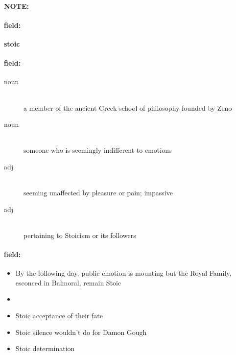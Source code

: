 \documentclass[12pt]{article}
\newenvironment{note}{\paragraph{NOTE:}}{}
\newenvironment{field}{\paragraph{field:}}{}
\begin{document}
\begin{note}
\begin{field}
\textbf{\large stoic}
\end{field}


\begin{field}
\begin{description}
\item[noun] \hfill \\ 
a member of the ancient Greek school of philosophy founded by Zeno

\item[noun] \hfill \\ 
someone who is seemingly indifferent to emotions

\item[adj] \hfill \\ 
seeming unaffected by pleasure or pain; impassive

\item[adj] \hfill \\ 
pertaining to Stoicism or its followers

\end{description}
\end{field}

\begin{field}
\begin{itemize}
\item By the following day, public emotion is mounting but the Royal Family, esconced in Balmoral, remain Stoic
\item 
\item Stoic acceptance of their fate
\item Stoic silence wouldn't do for Damon Gough
\item Stoic determination
\end{itemize}
\end{field}
\end{note}
\end{document}
